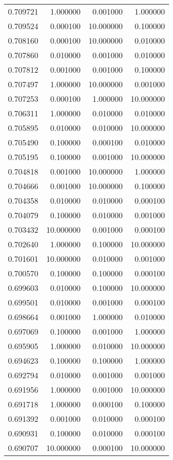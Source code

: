 \begin{tabular}{rrrr}
0.709721 & 1.000000 & 0.001000 & 1.000000 \\
0.709524 & 0.000100 & 10.000000 & 0.100000 \\
0.708160 & 0.000100 & 10.000000 & 0.010000 \\
0.707860 & 0.010000 & 0.001000 & 0.010000 \\
0.707812 & 0.001000 & 0.001000 & 0.100000 \\
0.707497 & 1.000000 & 10.000000 & 0.001000 \\
0.707253 & 0.000100 & 1.000000 & 10.000000 \\
0.706311 & 1.000000 & 0.010000 & 0.010000 \\
0.705895 & 0.010000 & 0.010000 & 10.000000 \\
0.705490 & 0.100000 & 0.000100 & 0.010000 \\
0.705195 & 0.100000 & 0.001000 & 10.000000 \\
0.704818 & 0.001000 & 10.000000 & 1.000000 \\
0.704666 & 0.001000 & 10.000000 & 0.100000 \\
0.704358 & 0.010000 & 0.010000 & 0.000100 \\
0.704079 & 0.100000 & 0.010000 & 0.001000 \\
0.703432 & 10.000000 & 0.001000 & 0.000100 \\
0.702640 & 1.000000 & 0.100000 & 10.000000 \\
0.701601 & 10.000000 & 0.010000 & 0.001000 \\
0.700570 & 0.100000 & 0.100000 & 0.000100 \\
0.699603 & 0.010000 & 0.100000 & 10.000000 \\
0.699501 & 0.010000 & 0.001000 & 0.000100 \\
0.698664 & 0.001000 & 1.000000 & 0.010000 \\
0.697069 & 0.100000 & 0.001000 & 1.000000 \\
0.695905 & 1.000000 & 0.010000 & 10.000000 \\
0.694623 & 0.100000 & 0.100000 & 1.000000 \\
0.692794 & 0.010000 & 0.001000 & 0.001000 \\
0.691956 & 1.000000 & 0.001000 & 10.000000 \\
0.691718 & 1.000000 & 0.000100 & 0.100000 \\
0.691392 & 0.001000 & 0.010000 & 0.000100 \\
0.690931 & 0.100000 & 0.010000 & 0.000100 \\
0.690707 & 10.000000 & 0.000100 & 10.000000 \\

\end{tabular}
